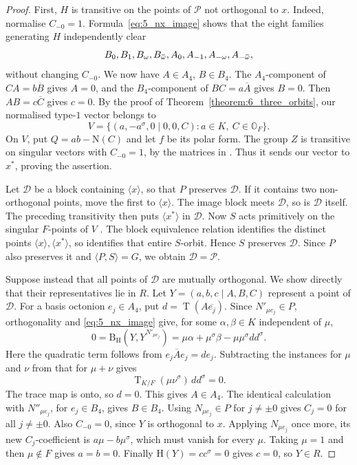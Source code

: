 \documentclass{amsart}
\def\ombb{\mathord{\mbox{\hspace*{0pt}}\;\!\overline{\!\!\:\omega\!\!\:}\;\!}\mbox{\hspace*{0pt}}}
\def\NN{\mathord{\mathrm{N}}}
\def\OO{\mathord{\mathbb{O}}}
\newcommand{\Tr}{\operatorname{T}}
\renewcommand{\bar}{\overline}
\newcommand{\B}{\mathrm{B}}
\renewcommand{\H}{\mathrm{H}}
\newcommand{\s}{\sigma}
\theoremstyle{plain}
\numberwithin{theorem}{section}
\theoremstyle{definition}
\begin{document}
\begin{proof}
    First, $H$ is transitive on the points of $\mathcal P$ not orthogonal
    to $x$. Indeed, normalise $C_{-0}=1$. Formula~\eqref{eq:5_nx_image}
    shows that the eight families generating $H$ independently clear
    \[
        B_0,B_1,B_\omega,B_{\ombb},
        A_0,A_{-1},A_{-\omega},A_{-\ombb},
    \]
    without changing $C_{-0}$. We now have $A\in A_4$, $B\in B_4$.
    The $A_4$-component of $CA=b\bar B$ gives $A=0$, and the
    $B_4$-component of $BC=a\bar A$ gives $B=0$. Then $AB=c\bar C$
    gives $c=0$. By the proof of Theorem~\ref{theorem:6_three_orbits}, our normalised
    type-$1$ vector belongs to
    \[
        V=\{(a,-a^\s,0\mid0,0,C):a\in K,\ C\in\OO_F\}.
    \]
    On $V$, put $Q=ab-\NN(C)$ and let $f$ be its polar form.
    The group $Z$ is transitive on singular vectors with $C_{-0}=1$,
    by the matrices in \cite[Lemma~2.1]{BSW1}. Thus it sends our vector
    to $x^*$, proving the assertion.

    Let $\mathcal D$ be a block containing $\langle x\rangle$, so that
    $P$ preserves $\mathcal D$.
    If it contains two non-orthogonal points, move the first to
    $\langle x\rangle$. The image block meets $\mathcal D$, so is
    $\mathcal D$ itself. The preceding transitivity then puts
    $\langle x^*\rangle$ in $\mathcal D$.
    Now $S$ acts primitively on the singular $F$-points of $V$
    \cite[Theorem~11.30]{Taylor}. The block equivalence relation
    identifies the distinct points $\langle x\rangle,\langle x^*\rangle$,
    so identifies that entire $S$-orbit. Hence $S$ preserves $\mathcal D$.
    Since $P$ also preserves it and $\langle P,S\rangle=G$,
    we obtain $\mathcal D=\mathcal P$.

    Suppose instead that all points of $\mathcal D$ are mutually orthogonal.
    We show directly that their representatives lie in $R$.
    Let $Y=(a,b,c\mid A,B,C)$ represent a point of $\mathcal D$.
    For a basis octonion $e_j\in A_4$, put $d=\Tr(A\overline{e_j})$.
    Since $N'_{\mu e_j}\in P$, orthogonality and
    \eqref{eq:5_nx_image} give, for some $\alpha,\beta\in K$ independent of $\mu$,
    \[
        0=\B_{\H}(Y,Y^{N'_{\mu e_j}})
          =\mu\alpha+\mu^\s\beta-\mu\mu^\s dd^\s.
    \]
    Here the quadratic term follows from $e_j\bar A e_j=d e_j$.
    Subtracting the instances for $\mu$ and $\nu$ from that for
    $\mu+\nu$ gives
    \[
        \Tr_{K/F}(\mu\nu^\s)\,dd^\s=0.
    \]
    The trace map is onto, so $d=0$. This gives $A\in A_4$.
    The identical calculation with $N''_{\mu e_j}$, for $e_j\in B_4$,
    gives $B\in B_4$. Using $N_{\mu e_j}\in P$ for $j\neq\pm0$
    gives $C_j=0$ for all $j\neq\pm0$.
    Also $C_{-0}=0$, since $Y$ is orthogonal to $x$.
    Applying $N_{\mu e_j}$ once more, its new $C_j$-coefficient
    is $a\mu-b\mu^\s$, which must vanish for every $\mu$.
    Taking $\mu=1$ and then $\mu\notin F$ gives $a=b=0$.
    Finally $\H(Y)=cc^\s=0$ gives $c=0$, so $Y\in R$.


\end{proof}
\end{document}

